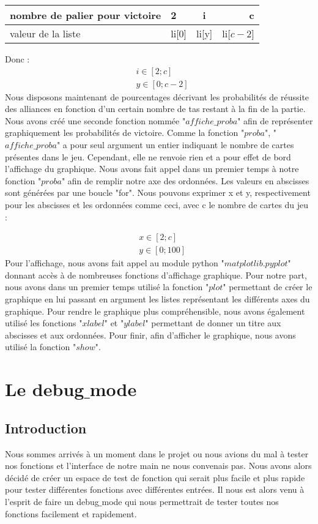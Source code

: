 \documentclass[10pt,a4paper,french,titlepage]{article}
\theoremstyle{definition}
\begin{document}
\begin{center}
\begin{tabular}{|p{3cm}|l|c|r|}
  \hline
  nombre de palier pour victoire & 2 & i & c\\
  \hline
  valeur de la liste & li[0] & li[y] & li[$c-2$] \\
  \hline
\end{tabular}
\end{center}
Donc :
\begin{align*}
&i \in [2;c]\\
&y \in [0;c-2]
\end{align*}
Nous disposons maintenant de pourcentages décrivant les probabilités de réussite des alliances en fonction d'un certain nombre de tas restant à la fin de la partie. Nous avons créé une seconde fonction nommée "$affiche\_proba$" afin de représenter graphiquement les probabilités de victoire. Comme la fonction "$proba$", "$affiche\_proba$" a pour seul argument un entier indiquant le nombre de cartes présentes dans le jeu. Cependant, elle ne renvoie rien et a pour effet de bord l'affichage du graphique. Nous avons fait appel dans un premier temps à notre fonction "$proba$" afin de remplir notre axe des ordonnées. Les valeurs en abscisses sont générées par une boucle
"for". Nous pouvons exprimer x et y, respectivement pour les abscisses et les ordonnées comme ceci, avec c le nombre de cartes du jeu :

\begin{align*}
&x \in [2;c] \\
&y \in [0;100]
\end{align*}
Pour l'affichage, nous avons fait appel au module python "$matplotlib.pyplot$" donnant accès à de nombreuses fonctions d'affichage graphique. Pour notre part, nous avons dans un premier temps utilisé la fonction "$plot$" permettant de créer le graphique en lui passant en argument les listes représentant les différents axes du graphique. Pour rendre le graphique plus compréhensible, nous avons également utilisé les fonctions "$xlabel$" et "$ylabel$" permettant de donner un titre aux abscisses et aux ordonnées. Pour finir, afin d'afficher le graphique, nous avons utilisé la fonction "$show$".

\section{Le debug$\_$mode}
\subsection{Introduction}
Nous sommes arrivés à un moment dans le projet ou nous avions du mal à tester nos fonctions et l’interface de notre main ne nous convenais pas. Nous avons alors décidé de créer un espace de test de fonction qui serait plus facile et plus rapide pour tester différentes fonctions avec différentes entrées. Il nous est alors venu à l’esprit de faire un debug$\_$mode qui nous permettrait de tester toutes nos fonctions facilement et rapidement.
\end{document}
